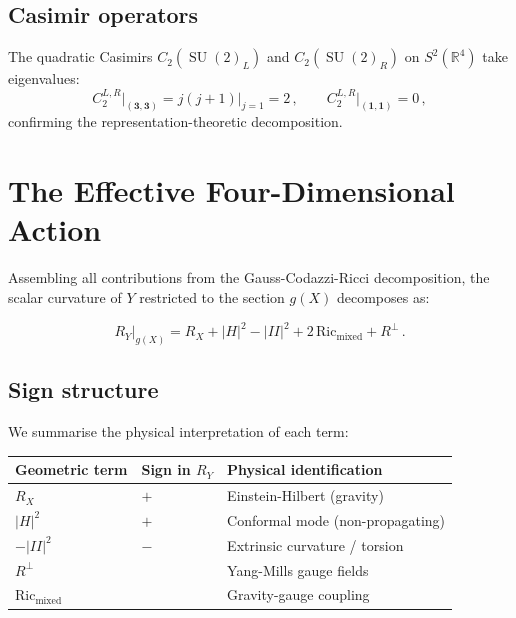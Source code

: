 \documentclass[12pt,a4paper]{article}
\theoremstyle{definition}
\newcommand{\SU}{\operatorname{SU}}
\newcommand{\R}{\mathbb{R}}
\begin{document}
\subsection{Casimir operators}

The quadratic Casimirs $C_2(\SU(2)_L)$ and $C_2(\SU(2)_R)$ on $S^2(\R^4)$ take eigenvalues:
\begin{equation}
C_2^{L,R}\big|_{(\mathbf{3},\mathbf{3})} = j(j+1)\big|_{j=1} = 2\,,\qquad
C_2^{L,R}\big|_{(\mathbf{1},\mathbf{1})} = 0\,,
\end{equation}
confirming the representation-theoretic decomposition.


\section{The Effective Four-Dimensional Action}
\label{sec:action}

Assembling all contributions from the Gauss-Codazzi-Ricci decomposition, the scalar curvature of $Y$ restricted to the section $g(X)$ decomposes as:

\begin{equation}
\label{eq:full_decomp}
R_Y\big|_{g(X)} = R_X + |H|^2 - |II|^2 + 2\,\mathrm{Ric}_{\mathrm{mixed}} + R^\perp\,.
\end{equation}

\subsection{Sign structure}

We summarise the physical interpretation of each term:

\begin{center}
\renewcommand{\arraystretch}{1.3}
\begin{tabular}{lll}
\toprule
\textbf{Geometric term} & \textbf{Sign in $R_Y$} & \textbf{Physical identification} \\
\midrule
$R_X$ & $+$ & Einstein-Hilbert (gravity) \\
$|H|^2$ & $+$ & Conformal mode (non-propagating) \\
$-|II|^2$ & $-$ & Extrinsic curvature / torsion \\
$R^\perp$ & & Yang-Mills gauge fields \\
$\mathrm{Ric}_{\mathrm{mixed}}$ & & Gravity-gauge coupling \\
\bottomrule
\end{tabular}
\end{center}
\end{document}
